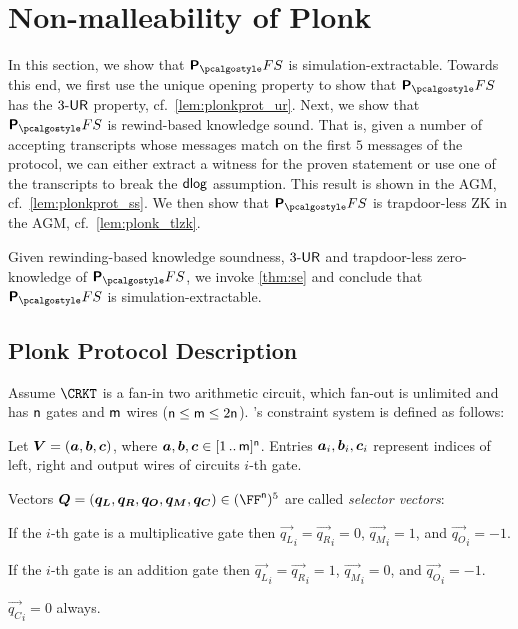 
\section{Non-malleability of Plonk} 
\label{sec:plonk}
In this section, we show that $\plonkprotfs$ is simulation-extractable. Towards this end, we first use the unique opening property to show that
$\plonkprotfs$ has the ${3\text{-}\mathsf{UR}}$ property,
cf.~\cref{lem:plonkprot_ur}.
Next, we show that $\plonkprotfs$ is rewind-based knowledge sound. That is, given a number of accepting transcripts whose messages match on the first $5$ messages of the protocol, we can either extract a witness for the proven statement or use one of the transcripts to break the $\mathsf{dlog}$ assumption. This result is shown in the AGM, cf.~\cref{lem:plonkprot_ss}. We then show that $\plonkprotfs$ is trapdoor-less ZK in the AGM, cf.~\cref{lem:plonk_tlzk}.

Given rewinding-based knowledge soundness, ${3\text{-}\mathsf{UR}}$ and trapdoor-less zero-knowledge of $\plonkprotfs$, we invoke \cref{thm:se} and conclude that $\plonkprotfs$ is simulation-extractable.

\newcommand{\vql}{\vec{q_{L}}}
\newcommand{\vqr}{\vec{q_{R}}}
\newcommand{\vqm}{\vec{q_{M}}}
\newcommand{\vqo}{\vec{q_{O}}}
\newcommand{\vx}{\vec{x}}
\newcommand{\vqc}{\vec{q_{C}}}

\subsection{Plonk Protocol Description}
\label{sec:plonk_explained}
Assume $\CRKT$ is a fan-in two arithmetic circuit,
which fan-out is unlimited and has $\mathsf{n}$ gates and $\mathsf{m}$ wires
($\mathsf{n} \leq \mathsf{m} \leq 2\mathsf{n}$). \plonk's constraint
system is defined as follows:
\begin{compactitem}
\item Let $\vec{V} = (\va, \vb, \vc)$, where $\va, \vb, \vc
  \in \range{1}{\noofw}^\numberofconstrains$. Entries $\va_i, \vb_i, \vc_i$ represent indices of left,
  right and output wires of circuits $i$-th gate.
\item Vectors $\vec{Q} = (\vql, \vqr, \vqo, \vqm, \vqc) \in
  (\FF^\numberofconstrains)^5$ are called \emph{selector vectors}:
  \begin{inparaenum}[(a)]
  \item If the $i$-th gate is a multiplicative gate then $\vql_i = \vqr_i = 0$,
    $\vqm_i = 1$, and $\vqo_i = -1$. 
  \item If the $i$-th gate is an addition gate then $\vql_i = \vqr_i  = 1$, $\vqm_i =
    0$, and $\vqo_i = -1$. 
  \item $\vqc_i = 0$ always. 
  \end{inparaenum}
\end{compactitem}

